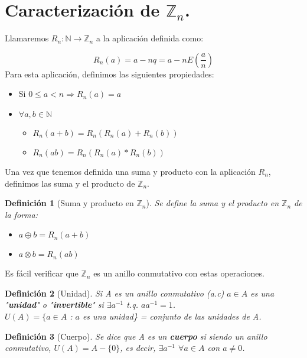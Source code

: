 \documentclass[11pt, a4paper, titlepage]{article}
\providecommand{\ent}{\mathbb{Z}}
\theoremstyle{theorem-style}
\theoremstyle{definition-style}
\newtheorem*{ndef}{Definición}
\theoremstyle{remark-style}
\theoremstyle{example-style}
\begin{document}
\section*{Caracterización de $\mathbb{Z}_{n}$.}

Llamaremos $R_n:\mathbb{N} \rightarrow \mathbb{Z}_n$ a la aplicación definida como:

\[
R_n(a) = a - nq = a- nE(\frac{a}{n})
\] 
Para esta aplicación, definimos las siguientes propiedades:

\begin{itemize}
\item Si $0 \leq a < n  \Rightarrow R_n(a) = a$
\item $\forall a,b \in \mathbb{N}$

\begin{itemize}
	\item  $R_n(a+b) = R_n(R_n(a) + R_n(b))$
	\item $R_n(ab) = R_n(R_n(a)*R_n(b))$
\end{itemize}

\end{itemize} 
\pagebreak

Una vez que tenemos definida una suma y producto con la aplicación $R_n$, definimos las suma y el producto de $\mathbb{Z}_n$.
\begin{ndef}[Suma y producto en $\ent_n$] Se define la suma y el producto en $\ent_n$ de la forma:
	\begin{itemize}
	\item $a\oplus b = R_n(a+b)$
	\item $a\otimes b = R_n(ab)$
\end{itemize}

\end{ndef}



Es fácil verificar que $\mathbb{Z}_n$ es un anillo conmutativo con estas operaciones.\\

\begin{ndef}[Unidad]
	Si A es un anillo conmutativo (a.c) $a \in A$ es una "\textbf{unidad}" o "\textbf{invertible}" si $\exists a^{-1}$ t.q. $ aa^{-1} = 1$.\\ $U(A) = \{ a \in A$ : $a$ es una unidad\} = conjunto de las unidades de A.\\
\end{ndef}



\begin{ndef}[Cuerpo] Se dice que A es un \textbf{cuerpo} si siendo un anillo conmutativo, $U(A) = A - \{0\}$, es decir, $\exists a^{-1}$ $\forall a \in A$ con $a \neq 0$.
\end{ndef}
\end{document}

